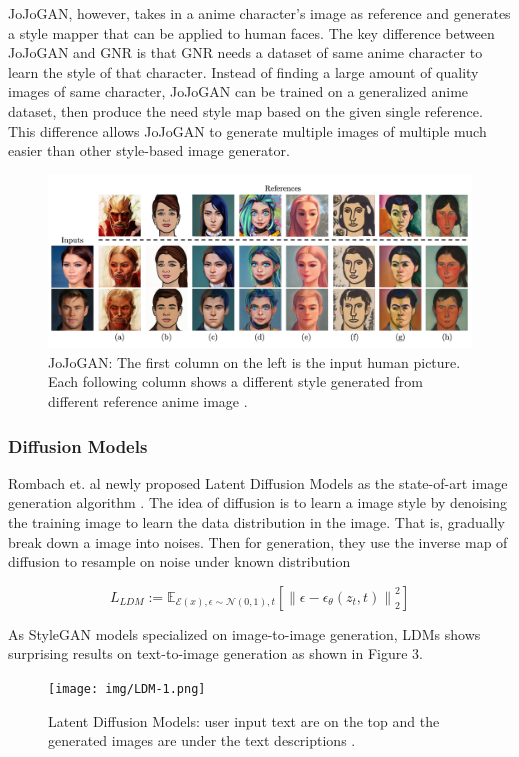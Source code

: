 JoJoGAN, however, takes in a anime character's image as reference and generates
a style mapper that can be applied to human faces.
The key difference between JoJoGAN and GNR is that GNR needs a dataset of same anime character to learn the style of that character.
Instead of finding a large amount of quality images of same character,
JoJoGAN can be trained on a generalized anime dataset,
then produce the need style map based on the given single reference.
This difference allows JoJoGAN to generate multiple images of multiple much easier than other style-based image generator.
\begin{figure}[h]
    \includegraphics[width=\textwidth]{img/JoJo-1.png}
    \caption{
        JoJoGAN: The first column on the left is the input human picture.
        Each following column shows a different style generated from different reference anime image \cite{chong2021jojogan}.
    }
\end{figure}

\subsubsection*{Diffusion Models}

Rombach et. al newly proposed Latent Diffusion Models as the state-of-art image generation algorithm \cite{Rombach2022High}.
The idea of diffusion is to learn a image style by denoising the training image to learn the data distribution in the image.
That is, gradually break down a image into noises.
Then for generation, they use the inverse map of diffusion to resample on noise under known distribution

$$
L_{L D M}:=\mathbb{E}_{\mathcal{E}(x), \epsilon \sim \mathcal{N}(0,1), t}\left[\left\|\epsilon-\epsilon_\theta\left(z_t, t\right)\right\|_2^2\right]
$$

As StyleGAN models specialized on image-to-image generation,
LDMs shows surprising results on text-to-image generation as shown in Figure 3.
\begin{figure}[]
    \texttt{[image: img/LDM-1.png]}
    \caption{
        Latent Diffusion Models:
        user input text are on the top
        and the generated images are under the text descriptions \cite{Rombach2022High}.
    }
\end{figure}

